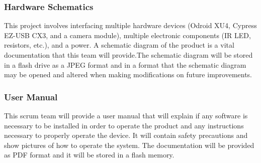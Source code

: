 \subsubsection{Hardware Schematics}
This project involves interfacing multiple hardware devices (Odroid XU4, Cypress EZ-USB CX3, and a camera module), multiple electronic components (IR LED, resistors, etc.), and a power. A schematic diagram of the product is a vital documentation that this team will provide.The schematic diagram will be stored in a flash drive as a JPEG format and in a format that the schematic diagram may be opened and altered when making modifications on future improvements.

\subsubsection{User Manual}
This scrum team will provide a user manual that will explain if any software is necessary to be installed in order to operate the product and any instructions necessary to properly operate the device. It will contain safety precautions and show pictures of how to operate the system. The documentation will be provided as PDF format and it will be stored in a flash memory.